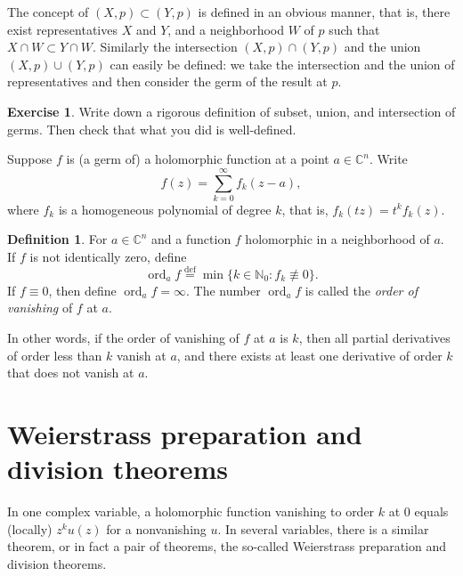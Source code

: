 \documentclass[12pt,openany]{book}
\newcommand{\ord}{\operatorname{ord}}
\newcommand{\C}{{\mathbb{C}}}
\newcommand{\N}{{\mathbb{N}}}
\newcommand{\myindex}[1]{#1\index{#1}}
\newcommand{\sectionnewpage}{}
\theoremstyle{plain}
\theoremstyle{remark}
\theoremstyle{definition}
\newtheorem{defn}[thm]{Definition}
\newenvironment{exbox}{%
    \def\FrameCommand{\vrule width 1pt \relax\hspace {10pt}}%
    \MakeFramed {\advance \hsize -\width \FrameRestore }%
}{%
    \endMakeFramed
}
\theoremstyle{exercise}
\newtheorem{exercise}{Exercise}[section]
\theoremstyle{example}
\begin{document}
The concept of $(X,p) \subset (Y,p)$ is defined in an obvious manner,
that is, there exist representatives $X$ and $Y$, and a neighborhood $W$
of $p$ such that $X \cap W \subset Y \cap W$.
Similarly the intersection $(X,p) \cap (Y,p)$ and
the union $(X,p) \cup (Y,p)$ can easily be defined: we take the intersection
and the union of representatives and then consider the germ of the result at $p$.

\begin{exbox}
\begin{exercise}
Write down a rigorous definition of subset, union, and intersection of germs.
Then check that what you did is well-defined.
\end{exercise}
\end{exbox}

Suppose
$f$ is (a germ of) a holomorphic function at a point $a \in \C^n$.
Write
\begin{equation*}
f(z) = \sum_{k=0}^\infty f_k(z-a),
\end{equation*}
where $f_k$ is a homogeneous polynomial of degree $k$,
that is, $f_k(tz) = t^k f_k(z)$.

\begin{defn}
For $a \in \C^n$ and a function $f$ holomorphic in a neighborhood of $a$.
If $f$ is not identically zero,
define
%
\begin{equation*}
\ord_a f \overset{\text{def}}{=} \min \{ k \in \N_0 : f_k \not\equiv 0 \} .
\end{equation*}
If $f \equiv 0$, then define $\ord_a f = \infty$.
The number $\ord_a f$ is called the \emph{\myindex{order of vanishing}} of $f$ at $a$.
\end{defn}

In other words, if the order of vanishing of $f$ at $a$ is $k$, then all
partial derivatives of order less than $k$ vanish at $a$, and there exists
at least one derivative of order $k$ that does not vanish at $a$.


\sectionnewpage
\section{Weierstrass preparation and division theorems} \label{sec:wpt}

In one complex variable, a holomorphic function 
vanishing to order $k$ at 0 equals (locally) $z^k u(z)$ for a nonvanishing $u$.
In several variables, there is a similar theorem, or in fact a pair of theorems,
the so-called Weierstrass preparation and
division theorems.
\end{document}
